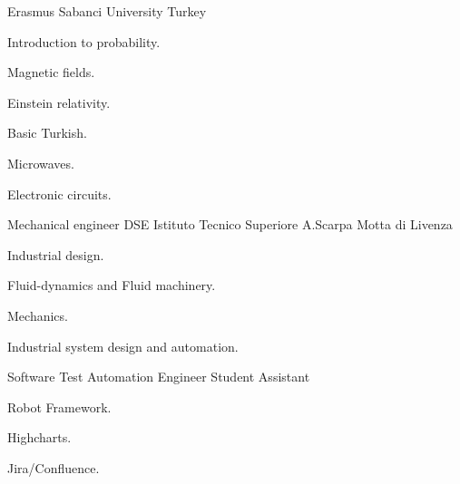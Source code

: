 \documentclass[english,a4paper]{europasscv}
\begin{document}
\begin{europasscv}
		 {
			Erasmus
		}
		\ecvitem{} {
			Sabanci University Turkey \newline
		}
		\ecvitem{} {
			\begin{ecvitemize}
				\item Introduction to probability.
				\item Magnetic fields.
				\item Einstein relativity.
				\item Basic Turkish.
				\item Microwaves.
				\item Electronic circuits.
			\end{ecvitemize}
		}

		 {
			Mechanical engineer
		}{DSE}
		\ecvitem{} {
		  Istituto Tecnico Superiore A.Scarpa\newline
                  Motta di Livenza\newline
		}
		\ecvitem{} {
			\begin{ecvitemize}
				\item Industrial design.
				\item Fluid-dynamics and Fluid machinery.
				\item Mechanics.
				\item Industrial system design and automation.
			\end{ecvitemize}
		}


		 {
                  Software Test Automation Engineer \newline
                  Student Assistant
		}
		\ecvitem{} {
			\begin{ecvitemize}
				\item Robot Framework.
				\item Highcharts.
				\item Jira/Confluence.
			\end{ecvitemize}
		}


\end{europasscv}
\end{document}
